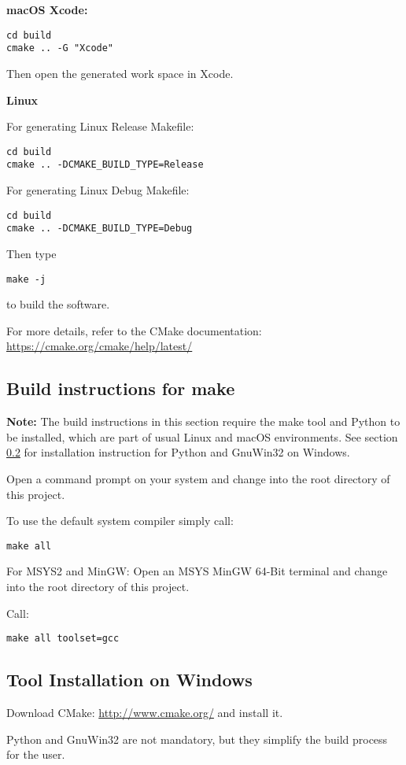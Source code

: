 \documentclass[a4paper,11pt]{jvetdoc}
\begin{document}
\textbf{macOS Xcode:}
\begin{verbatim}
cd build
cmake .. -G "Xcode"
\end{verbatim}
Then open the generated work space in Xcode.

\textbf{Linux}

For generating Linux Release Makefile:
\begin{verbatim}
cd build
cmake .. -DCMAKE_BUILD_TYPE=Release
\end{verbatim}
For generating Linux Debug Makefile:
\begin{verbatim}
cd build
cmake .. -DCMAKE_BUILD_TYPE=Debug
\end{verbatim}
Then type
\begin{verbatim}
make -j
\end{verbatim}
to build the software.

For more details, refer to the CMake documentation: \url{https://cmake.org/cmake/help/latest/}

\subsection {Build instructions for make}

\textbf{Note:}
The build instructions in this section require the make tool and Python
to be installed, which are part of usual Linux and macOS environments. 
See section \ref{windowsinstall} for installation instruction for Python 
and GnuWin32 on Windows.

Open a command prompt on your system and change into the root directory
of this project.

To use the default system compiler simply call:
\begin{verbatim}
make all
\end{verbatim}
For MSYS2 and MinGW:
Open an MSYS MinGW 64-Bit terminal and change into the root directory
of this project.

Call:
\begin{verbatim}
make all toolset=gcc
\end{verbatim}

\subsection{Tool Installation on Windows}
\label{windowsinstall}

Download CMake: \url{http://www.cmake.org/} and install it.

Python and GnuWin32 are not mandatory, but they simplify the build process for the user.
\end{document}
